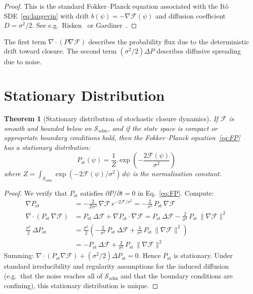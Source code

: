 \documentclass[12pt]{article}
\newtheorem{theorem}{Theorem}
\newcommand{\Fcal}{\mathcal{F}}
\newcommand{\Sadm}{\mathcal{S}_{\mathrm{adm}}}
\begin{document}
\begin{proof}
This is the standard Fokker--Planck equation associated with the It\^o SDE~\eqref{eq:langevin} with drift $b(\psi) = -\nabla\Fcal(\psi)$ and diffusion coefficient $D = \sigma^2/2$. See e.g.\ Risken~\citep{Risken1989} or Gardiner~\citep{Gardiner2009}.
\end{proof}

The first term $\nabla \cdot (P\nabla\Fcal)$ describes the probability flux due to the deterministic drift toward closure. The second term $(\sigma^2/2)\Delta P$ describes diffusive spreading due to noise.

\section{Stationary Distribution}\label{sec:stationary}

\begin{theorem}[Stationary distribution of stochastic closure dynamics]\label{thm:stationary}
If $\Fcal$ is smooth and bounded below on $\Sadm$, and if the state space is compact or appropriate boundary conditions hold, then the Fokker--Planck equation~\eqref{eq:FP} has a stationary distribution:
\begin{equation}\label{eq:stationary}
    P_{\mathrm{st}}(\psi) = \frac{1}{Z}\, \exp\!\left(-\frac{2\Fcal(\psi)}{\sigma^2}\right)
\end{equation}
where $Z = \int_{\Sadm} \exp(-2\Fcal(\psi)/\sigma^2)\, d\psi$ is the normalisation constant.
\end{theorem}

\begin{proof}
We verify that $P_{\mathrm{st}}$ satisfies $\partial P/\partial t = 0$ in Eq.~\eqref{eq:FP}. Compute:
\begin{align}
    \nabla P_{\mathrm{st}} &= -\frac{2}{Z\sigma^2}\, \nabla\Fcal\, e^{-2\Fcal/\sigma^2} = -\frac{2}{\sigma^2}\, P_{\mathrm{st}}\, \nabla\Fcal \\
    \nabla \cdot (P_{\mathrm{st}}\, \nabla\Fcal) &= P_{\mathrm{st}}\, \Delta\Fcal + \nabla P_{\mathrm{st}} \cdot \nabla\Fcal = P_{\mathrm{st}}\, \Delta\Fcal - \frac{2}{\sigma^2}\, P_{\mathrm{st}}\, \|\nabla\Fcal\|^2 \\
    \frac{\sigma^2}{2}\, \Delta P_{\mathrm{st}} &= \frac{\sigma^2}{2}\left(-\frac{2}{\sigma^2}\, P_{\mathrm{st}}\, \Delta\Fcal + \frac{4}{\sigma^4}\, P_{\mathrm{st}}\, \|\nabla\Fcal\|^2\right) \\
    &= -P_{\mathrm{st}}\, \Delta\Fcal + \frac{2}{\sigma^2}\, P_{\mathrm{st}}\, \|\nabla\Fcal\|^2
\end{align}
Summing: $\nabla \cdot (P_{\mathrm{st}}\nabla\Fcal) + (\sigma^2/2)\Delta P_{\mathrm{st}} = 0$. Hence $P_{\mathrm{st}}$ is stationary. Under standard irreducibility and regularity assumptions for the induced diffusion (e.g.\ that the noise reaches all of $\Sadm$ and that the boundary conditions are confining), this stationary distribution is unique.
\end{proof}
\end{document}
